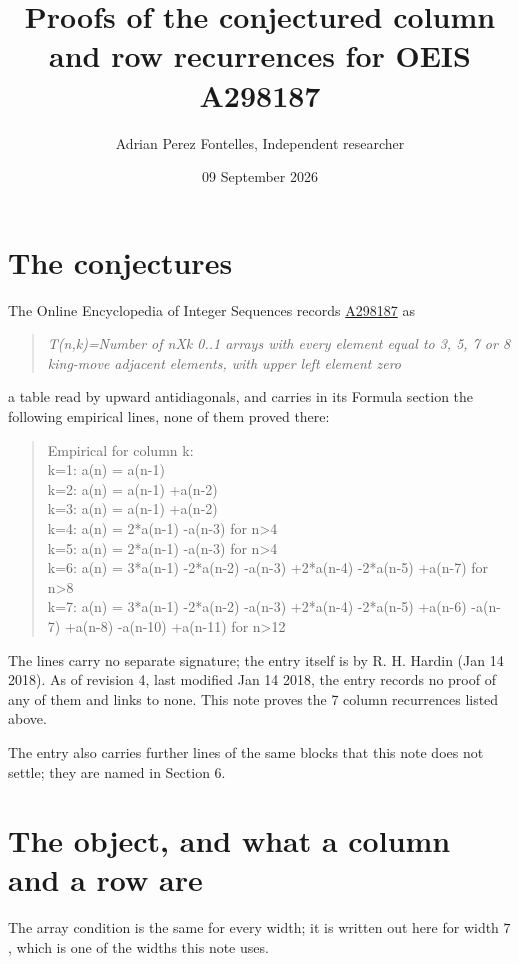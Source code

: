 \documentclass[11pt]{article}
\title{Proofs of the conjectured column and row recurrences for OEIS A298187}
\author{Adrian Perez Fontelles, Independent researcher}
\date{09 September 2026}
\theoremstyle{definition}
\begin{document}
\maketitle
\section{The conjectures}

The Online Encyclopedia of Integer Sequences records \href{https://oeis.org/A298187}{A298187} as

\begin{quote}\itshape T(n,k)=Number of nXk 0..1 arrays with every element equal to 3, 5, 7 or 8 king-move adjacent elements, with upper left element zero\end{quote}

a table read by upward antidiagonals, and carries in its Formula section the following empirical lines, none of them proved there:

\begin{quote}\ttfamily Empirical for column k:\\
k=1: a(n) = a(n-1)\\k=2: a(n) = a(n-1) +a(n-2)\\k=3: a(n) = a(n-1) +a(n-2)\\k=4: a(n) = 2*a(n-1) -a(n-3) for n>4\\k=5: a(n) = 2*a(n-1) -a(n-3) for n>4\\k=6: a(n) = 3*a(n-1) -2*a(n-2) -a(n-3) +2*a(n-4) -2*a(n-5) +a(n-7) for n>8\\k=7: a(n) = 3*a(n-1) -2*a(n-2) -a(n-3) +2*a(n-4) -2*a(n-5) +a(n-6) -a(n-7) +a(n-8) -a(n-10) +a(n-11) for n>12\end{quote}

The lines carry no separate signature; the entry itself is by R. H. Hardin (Jan 14 2018). As of revision 4, last modified Jan 14 2018, the entry records no proof of any of them and links to none. This note proves the 7 column recurrences listed above.

The entry also carries further lines of the same blocks that this note does not settle; they are named in Section 6.

\section{The object, and what a column and a row are}

The array condition is the same for every width; it is written out here for width $7$, which is one of the widths this note uses.
\end{document}
